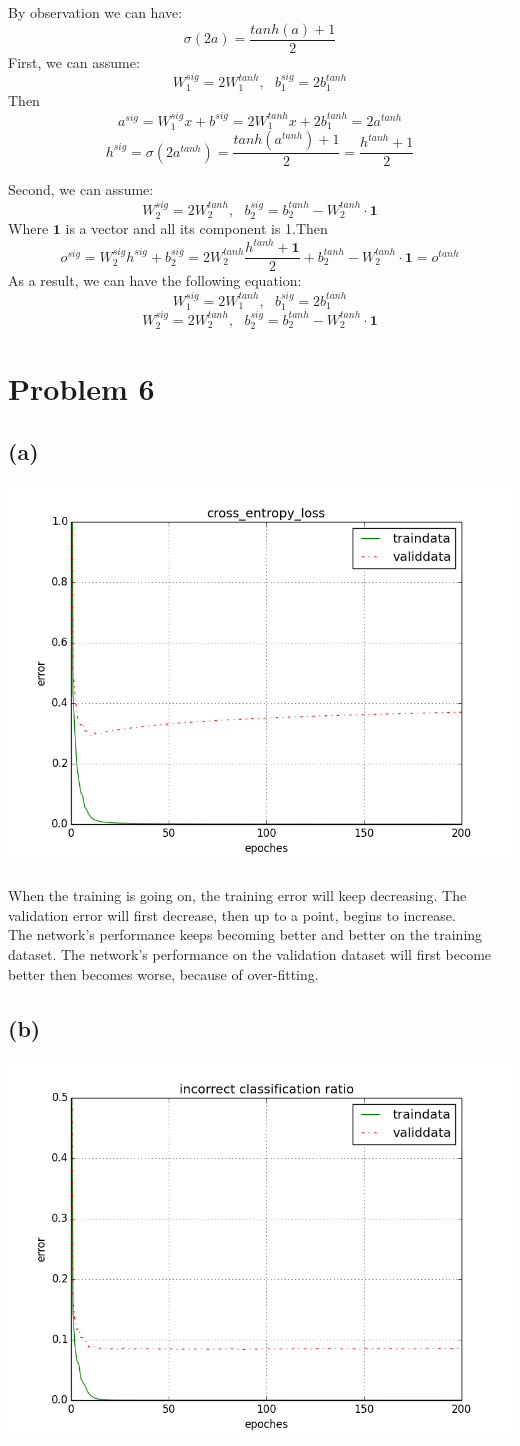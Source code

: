 \documentclass[twoside]{article}
\begin{document}
By observation we can have:
$$\sigma(2a) = \frac{tanh(a)+1}{2}$$
First, we can assume:
$$W_1^{sig} = 2W_1^{tanh},\ \ \ b_1^{sig}=2b_1^{tanh}$$
Then $$a^{sig} = W^{sig}_{1}x + b^{sig} = 2W_1^{tanh}x+2b_1^{tanh} = 2 a^{tanh}$$
$$h^{sig}=\sigma(2 a^{tanh}) = \frac{tanh(a^{tanh})+1}{2}=\frac{h^{tanh}+1}{2}$$

Second, we can assume:
$$W_2^{sig} = 2W_2^{tanh},\ \ \ b_2^{sig}=b_2^{tanh}-W_2^{tanh} \cdot \mathbf{1}$$
Where $\mathbf{1}$ is a vector and all its component is 1.Then $$o^{sig} =  W^{sig}_2 h^{sig} + b^{sig}_2=2W_2^{tanh}\frac{h^{tanh}+\mathbf{1}}{2} +b_2^{tanh}-W_2^{tanh} \cdot \mathbf{1}=o^{tanh} $$
As a result, we can have the following equation:
$$W_1^{sig} = 2W_1^{tanh},\ \ \ b_1^{sig}=2b_1^{tanh}$$
$$W_2^{sig} = 2W_2^{tanh},\ \ \ b_2^{sig}=b_2^{tanh}-W_2^{tanh} \cdot \mathbf{1}$$

\section{Problem 6}
\subsection{(a)}
\includegraphics[width=0.5\linewidth]{images/problem_a}
\paragraph{} When the training is going on, the training error will keep decreasing. The validation error will first decrease, then up to a point, begins to increase. \\
The network's performance keeps becoming better and better on the training dataset. The network's performance on the validation dataset will first become better then becomes worse, because of over-fitting.


\subsection{(b)}
\includegraphics[width=0.5\linewidth]{images/problem_b}
\end{document}
